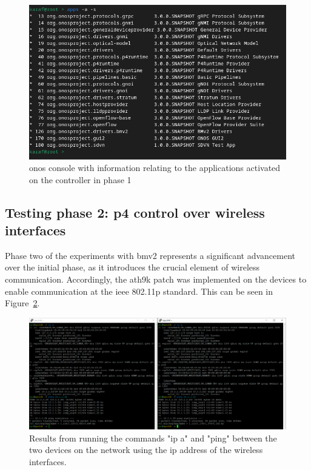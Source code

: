 \begin{figure}
	\centering
	\includegraphics[width=\textwidth]{Chapters/Figures/tests/bmv2_phase_1/onos_apps.PNG}
	\caption{\gls{onos} console with information relating to the applications activated on the controller in phase 1}
	\label{fig:exp2_phase1_onos_apps}
\end{figure}

\subsection[Testing phase 2: P4 control over wireless interfaces]{Testing phase 2: \gls{p4} control over wireless interfaces}

Phase two of the experiments with \gls{bmv2} represents a significant advancement over the initial phase, as it introduces the crucial element of wireless communication. Accordingly, the ath9k patch was implemented on the devices to enable communication at the \gls{ieee} 802.11p standard. This can be seen in Figure~\ref{fig:exp2_phase2_wireless}.

\begin{figure}
	\centering
	\includegraphics[width=\textwidth]{Chapters/Figures/tests/bmv2_phase_2/wireless_config_&_connectivity.PNG}
	\caption{Results from running the commands "ip a" and "ping" between the two devices on the network using the \gls{ip} address of the wireless interfaces.}
	\label{fig:exp2_phase2_wireless}
\end{figure}

